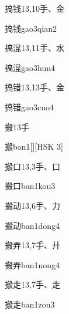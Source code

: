 \begin{entry}{搞钱}{13,10}{⼿、⾦}
  \begin{phonetics}{搞钱}{gao3qian2}
  \end{phonetics}
\end{entry}

\begin{entry}{搞混}{13,11}{⼿、⽔}
  \begin{phonetics}{搞混}{gao3hun4}
  \end{phonetics}
\end{entry}

\begin{entry}{搞错}{13,13}{⼿、⾦}
  \begin{phonetics}{搞错}{gao3cuo4}
  \end{phonetics}
\end{entry}

\begin{entry}{搬}{13}{⼿}
  \begin{phonetics}{搬}{ban1}[][HSK 3]
  \end{phonetics}
\end{entry}

\begin{entry}{搬口}{13,3}{⼿、⼝}
  \begin{phonetics}{搬口}{ban1kou3}
  \end{phonetics}
\end{entry}

\begin{entry}{搬动}{13,6}{⼿、⼒}
  \begin{phonetics}{搬动}{ban1dong4}
  \end{phonetics}
\end{entry}

\begin{entry}{搬弄}{13,7}{⼿、⼶}
  \begin{phonetics}{搬弄}{ban1nong4}
  \end{phonetics}
\end{entry}

\begin{entry}{搬走}{13,7}{⼿、⾛}
  \begin{phonetics}{搬走}{ban1zou3}
  \end{phonetics}
\end{entry}

